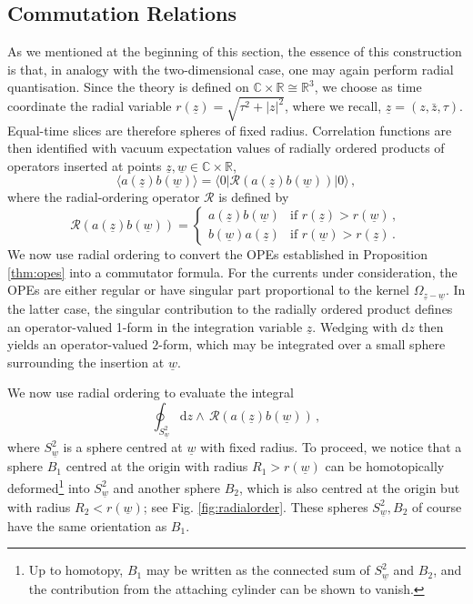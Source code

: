 \documentclass[11pt]{amsart}
\newcommand{\R}{{\mathbb R}}
\newcommand{\C}{{\mathbb C}}
\numberwithin{equation}{section}
\numberwithin{figure}{section}
\numberwithin{table}{section}
\renewcommand{\d}{\mathrm{d}}
\theoremstyle{thm}
\numberwithin{equation}{subsection}
\theoremstyle{definition}
\theoremstyle{rem}
\begin{document}




\subsection{Commutation Relations}\label{sec:commutators}
As we mentioned at the beginning of this section, the essence of this construction is that, in analogy with the two-dimensional case, one may again perform radial quantisation. Since the theory is defined on $\C\times\R \cong \mathbb{R}^3$, we choose as time coordinate the radial variable $r(\underline{z})=\sqrt{\tau^2+|z|^2}$, where we recall, $\underline{z}=(z,\bar z,\tau)$. Equal-time slices are therefore spheres of fixed radius. Correlation functions are then identified with vacuum expectation values of radially ordered products of operators inserted at points $\underline{z},\underline{w}\in\C \times \R$,
\begin{equation}
    \langle a(\underline{z})b(\underline{w})\rangle
    = \langle 0|\mathcal{R}(a(\underline{z})b(\underline{w}))|0\rangle \,,
\end{equation}
where the radial-ordering operator $\mathcal{R}$ is defined by
\begin{equation}
    \mathcal{R}(a(\underline{z})b(\underline{w}))=
    \begin{cases}
        a(\underline{z})b(\underline{w}) & \text{if } r(\underline{z})>r(\underline{w})\,,\\
        b(\underline{w})a(\underline{z}) & \text{if } r(\underline{w})>r(\underline{z})\,.
    \end{cases}
\end{equation}
We now use radial ordering to convert the OPEs established in Proposition \ref{thm:opes} into a commutator formula. For the currents under consideration, the OPEs are either regular or have singular part proportional to the kernel $\Omega_{\underline{z}-\underline{w}}$. In the latter case, the singular contribution to the radially ordered product defines an operator-valued 1-form in the integration variable $\underline{z}$. Wedging with $\d z$ then yields an operator-valued $2$-form, which may be integrated over a small sphere surrounding the insertion at $\underline{w}$. 


We now use radial ordering to evaluate the integral
\begin{equation}
    \oint_{S_{\underline{w}}^2}\d z \wedge \, \mathcal{R}(a(\underline{z})b(\underline{w}))\,,
\end{equation}
where $S_{\underline{w}}^2$ is a sphere centred at $\underline{w}$ with fixed radius. To proceed, we notice that a sphere $B_1$ centred at the origin with radius $R_1 > r(\underline{w})$ can be homotopically deformed\footnote{Up to homotopy, $B_1$ may be written as the connected sum of $S^2_{\underline{w}}$ and $B_2$, and the contribution from the attaching cylinder can be shown to vanish.} into $S_{\underline{w}}^2$ and another sphere $B_2$, which is also centred at the origin but with radius $R_2< r(\underline{w})$; see Fig. \ref{fig:radialorder}. These spheres $S_{\underline{w}}^2,B_2$ of course have the same orientation as $B_1$.
\end{document}
